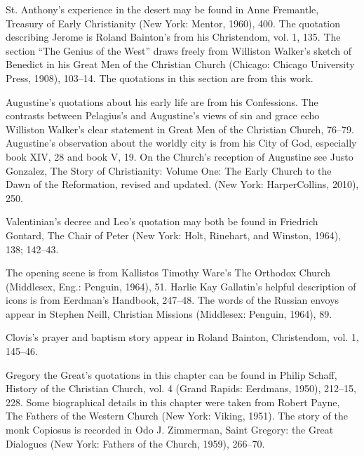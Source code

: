 \begin{notelist}
\entry St. Anthony’s experience in the desert may be found in Anne Fremantle, Treasury of Early
  Christianity (New York: Mentor, 1960), 400.
\entry The quotation describing Jerome is Roland Bainton’s from his Christendom, vol. 1, 135.
\entry The section “The Genius of the West” draws freely from Williston Walker’s sketch of Benedict
  in his Great Men of the Christian Church (Chicago: Chicago University Press, 1908), 103–14. The
  quotations in this section are from this work.
\end{notelist}

\begin{notelist}
\entry Augustine’s quotations about his early life are from his Confessions.
\entry The contrasts between Pelagius’s and Augustine’s views of sin and grace echo Williston
  Walker’s clear statement in Great Men of the Christian Church, 76–79.
\entry Augustine’s observation about the worldly city is from his City of God, especially book XIV,
  28 and book V, 19.
\entry On the Church’s reception of Augustine see Justo Gonzalez, The Story of Christianity: Volume
  One: The Early Church to the Dawn of the Reformation, revised and updated. (New York:
  HarperCollins, 2010), 250.
\end{notelist}

\begin{notelist}
\entry Valentinian’s decree and Leo’s quotation may both be found in Friedrich Gontard, The Chair of
  Peter (New York: Holt, Rinehart, and Winston, 1964), 138; 142–43.
\end{notelist}

\begin{notelist}
\entry The opening scene is from Kallistos Timothy Ware’s The Orthodox Church (Middlesex, Eng.:
  Penguin, 1964), 51.
\entry Harlie Kay Gallatin’s helpful description of icons is from Eerdman’s Handbook, 247–48.
\entry The words of the Russian envoys appear in Stephen Neill, Christian Missions (Middlesex:
  Penguin, 1964), 89.
\end{notelist}

\begin{notelist}
\entry Clovis’s prayer and baptism story appear in Roland Bainton, Christendom, vol. 1, 145–46.
\end{notelist}

\begin{notelist}
\entry Gregory the Great’s quotations in this chapter can be found in Philip Schaff, History of the
  Christian Church, vol. 4 (Grand Rapids: Eerdmans, 1950), 212–15, 228.
\entry Some biographical details in this chapter were taken from Robert Payne, The Fathers of the
  Western Church (New York: Viking, 1951).
\entry The story of the monk Copiosus is recorded in Odo J. Zimmerman, Saint Gregory: the Great
  Dialogues (New York: Fathers of the Church, 1959), 266–70.
\end{notelist}

